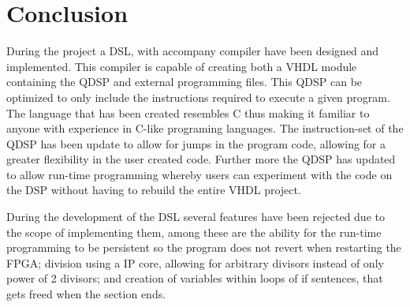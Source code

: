 \chapter{Conclusion}
During the project a DSL, with accompany compiler have been designed and implemented. This compiler is capable of creating both a VHDL module containing the QDSP and external programming files. This QDSP can be optimized to only include the instructions required to execute a given program. The language that has been created resembles C thus making it familiar to anyone with experience in C-like programing languages. The instruction-set of the QDSP has been update to allow for jumps in the program code, allowing for a greater flexibility in the user created code. Further more the QDSP has updated to allow run-time programming whereby users can experiment with the code on the DSP without having to rebuild the entire VHDL project.

During the development of the DSL several features have been rejected due to the scope of implementing them, among these are the ability for the run-time programming to be persistent so the program does not revert when restarting the FPGA; division using a IP core, allowing for arbitrary divisors instead of only power of 2 divisors; and creation of variables within loops of if sentences, that gets freed when the section ends.